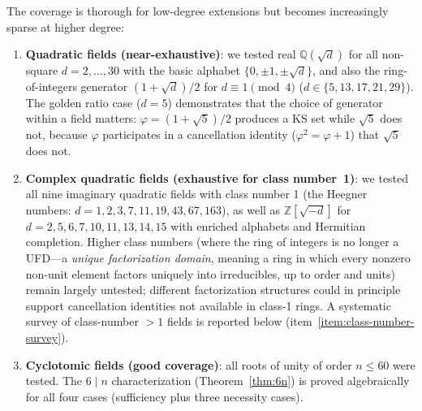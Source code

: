 \documentclass[12pt,a4paper]{article}
\newcommand{\Z}{\mathbb{Z}}
\newcommand{\Q}{\mathbb{Q}}
\begin{document}
The coverage is thorough for low-degree extensions but becomes increasingly sparse at higher degree:

\begin{enumerate}
    \item \textbf{Quadratic fields (near-exhaustive)}: we tested real $\Q(\sqrt{d})$ for all non-square $d = 2, \ldots, 30$ with the basic alphabet $\{0, \pm 1, \pm\sqrt{d}\}$, and also the ring-of-integers generator $(1+\sqrt{d})/2$ for $d \equiv 1\pmod{4}$ ($d \in \{5, 13, 17, 21, 29\}$).  The golden ratio case ($d = 5$) demonstrates that the choice of generator within a field matters: $\varphi = (1+\sqrt{5})/2$ produces a KS set while $\sqrt{5}$ does not, because $\varphi$ participates in a cancellation identity ($\varphi^2 = \varphi + 1$) that $\sqrt{5}$ does not.
    \item \textbf{Complex quadratic fields (exhaustive for class number~1)}: we tested all nine imaginary quadratic fields with class number 1 (the Heegner numbers: $d = 1, 2, 3, 7, 11, 19, 43, 67, 163$), as well as $\Z[\sqrt{-d}]$ for $d = 2, 5, 6, 7, 10, 11, 13, 14, 15$ with enriched alphabets and Hermitian completion.  Higher class numbers (where the ring of integers is no longer a UFD---a \emph{unique factorization domain}, meaning a ring in which every nonzero non-unit element factors uniquely into irreducibles, up to order and units) remain largely untested; different factorization structures could in principle support cancellation identities not available in class-1 rings. A systematic survey of class-number $> 1$ fields is reported below (item~\ref{item:class-number-survey}).
    \item \textbf{Cyclotomic fields (good coverage)}: all roots of unity of order $n \leq 60$ were tested.  The $6 \mid n$ characterization (Theorem~\ref{thm:6n}) is proved algebraically for all four cases (sufficiency plus three necessity cases).

\end{enumerate}
\end{document}
